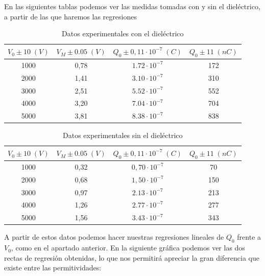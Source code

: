 \documentclass[a4paper,12pt,titlepage]{article}
\begin{document}
En las siguientes tablas podemos ver las medidas tomadas con y sin el dieléctrico, a partir de las que haremos las regresiones

\begin{table}[h!]
\centering
\begin{tabular}{|c|c|c|c|}
\hline
$V_0 \pm 10\; (V)$  & $V_M \pm 0.05 \;(V)$ & $Q_0 \pm 0,11\cdot 10^{-7}\;(C)$ & $Q_0 \pm 11\;(nC)$  \\ \hline
1000 & 0,78 & $1.72\cdot 10^{-7}$ & 172\\ \hline
2000 & 1,41 & $3.10 \cdot 10^{-7}$  & 310\\ \hline
3000 & 2,51 & $5.52\cdot 10^{-7}$ & 552\\ \hline
4000 & 3,20  & $7.04 \cdot 10^{-7}$  & 704\\ \hline
5000 & 3,81 & $8.38 \cdot 10^{-7}$ & 838\\ \hline
\end{tabular}
\caption{Datos experimentales con el dieléctrico}
\label{tab:my-table}
\end{table}

\newpage

\begin{table}[h!]
\centering
\begin{tabular}{|c|c|c|c|}
\hline
$V_0 \pm 10\; (V)$  & $V_M \pm 0.05 \;(V)$ & $Q_0 \pm 0,11\cdot 10^{-7}\;(C)$ & $Q_0 \pm 11\;(nC)$  \\ \hline
1000 & 0,32 & $0,70\cdot 10^{-7}$  & 70 \\ \hline
2000 & 0,68 & $1,50\cdot 10^{-7}$ &  150\\ \hline
3000 & 0,97 & $2.13 \cdot 10^{-7}$ &  213\\ \hline
4000 & 1,26 & $2.77 \cdot 10^{-7}$ &  277\\ \hline
5000 & 1,56 & $3.43 \cdot 10^{-7}$ &  343 \\ \hline
\end{tabular}
\caption{Datos experimentales sin el dieléctrico}
\label{tab:my-table}
\end{table}

A partir de estos datos podemos hacer nuestras regresiones lineales de $Q_0$ frente a $V_0$, como en el apartado anterior. En la siguiente gráfica podemos ver las dos rectas de regresión obtenidas, lo que nos permitirá apreciar la gran diferencia que existe entre las permitividades:
\end{document}
